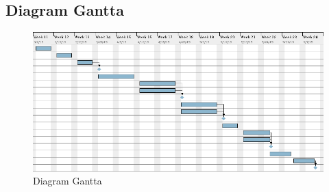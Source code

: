 \newpage
\subsection{Diagram Gantta}
\begin{figure}[H] 
 \begin{center}
  \includegraphics[width=\textwidth]{../harmonogram/gantt_uaktualniony.png}
 \end{center}
 \caption{Diagram Gantta}
 \label{fig:gantt}
\end{figure}
 
